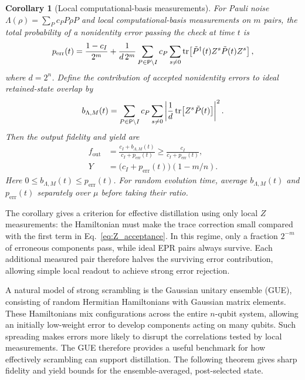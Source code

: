 \documentclass[onecolumn,prx,longbibliography,nofootinbib, superscriptaddress]{revtex4-2}
\newtheorem{corollary}{Corollary}
\theoremstyle{recap}
\begin{document}
\begin{corollary}[Local computational-basis measurements]\label{cor:Z_OTOC}
    For Pauli noise $\Lambda(\rho)=\sum_Pc_P P\rho P$ and local computational-basis measurements on $m$ pairs, the total probability of a nonidentity error passing the check at time $t$ is
    \begin{equation}\label{eq:Z_acceptance}
        p_{\mathrm{err}}(t)=\frac{1-c_I}{2^m}
        +\frac{1}{d\,2^m}\sum_{P\in\mathsf{P}\backslash I}c_P
        \sum_{s\neq 0}\tr\!\left[\tilde{P}^{\dagger}(t)Z^s\tilde{P}(t)Z^s\right],
    \end{equation}
    where $d=2^n$. Define the contribution of accepted nonidentity errors to ideal retained-state overlap by
    \begin{equation}\label{eq:benign_weight}
        b_{\Lambda,M}(t)=\sum_{P\in\mathsf{P}\backslash I}c_P
        \sum_{s\neq 0}\left|\frac{1}{d}\tr\!\left[Z^s\tilde P(t)\right]\right|^2.
    \end{equation}
    Then the output fidelity and yield are
    \begin{equation}\label{eq:local_exact_fidelity}
    \begin{split}
        f_{\mathrm{out}}&=\frac{c_I+b_{\Lambda,M}(t)}{c_I+p_{\mathrm{err}}(t)}
        \geq\frac{c_I}{c_I+p_{\mathrm{err}}(t)},\\
        Y&=\bigl(c_I+p_{\mathrm{err}}(t)\bigr)(1-m/n).
    \end{split}
    \end{equation}
    Here $0\leq b_{\Lambda,M}(t)\leq p_{\mathrm{err}}(t)$. For random evolution time, average $b_{\Lambda,M}(t)$ and $p_{\mathrm{err}}(t)$ separately over $\mu$ before taking their ratio.
\end{corollary}

The corollary gives a criterion for effective distillation using only local $Z$ measurements: the Hamiltonian must make the trace correction small compared with the first term in Eq.~\eqref{eq:Z_acceptance}. In this regime, only a fraction $2^{-m}$ of erroneous components pass, while ideal EPR pairs always survive. Each additional measured pair therefore halves the surviving error contribution, allowing simple local readout to achieve strong error rejection.

A natural model of strong scrambling is the Gaussian unitary ensemble (GUE), consisting of random Hermitian Hamiltonians with Gaussian matrix elements. These Hamiltonians mix configurations across the entire $n$-qubit system, allowing an initially low-weight error to develop components acting on many qubits. Such spreading makes errors more likely to disrupt the correlations tested by local measurements. The GUE therefore provides a useful benchmark for how effectively scrambling can support distillation. The following theorem gives sharp fidelity and yield bounds for the ensemble-averaged, post-selected state.
\end{document}
